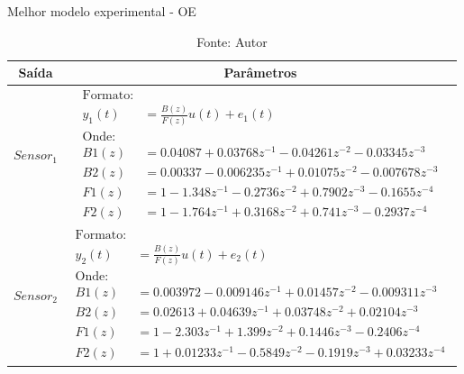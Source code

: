 \begin{table}[h]
	\centering
	\caption{Melhor modelo experimental - OE}
	\label{tab:tclabsp-model-oe}
	\begin{tabular}{c|c} \toprule
		{Saída}			&	{Parâmetros}									\\ \midrule
		$Sensor_1$			&
								$ 
									\begin{aligned}
										\text{Formato:}																	\\
										y_1(t) &= \frac{B(z)}{F(z)}u(t) + e_1(t)										\\
										\text{Onde:}																	\\
										B1(z) &= 0.04087 + 0.03768 z^{-1} - 0.04261 z^{-2} - 0.03345 z^{-3}    			\\
										B2(z) &= 0.00337 - 0.006235 z^{-1} + 0.01075 z^{-2} - 0.007678 z^{-3}  			\\
										F1(z) &= 1 - 1.348 z^{-1} - 0.2736 z^{-2} + 0.7902 z^{-3} - 0.1655 z^{-4}		\\
										F2(z) &= 1 - 1.764 z^{-1} + 0.3168 z^{-2} + 0.741 z^{-3} - 0.2937 z^{-4}   
									\end{aligned}
								$	
							\\ \midrule
		$Sensor_2$			&
								$ 
									\begin{aligned}
										\text{Formato:}																	\\
										y_2(t) &= \frac{B(z)}{F(z)}u(t) + e_2(t)										\\
										\text{Onde:}																	\\
										B1(z) &= 0.003972 - 0.009146 z^{-1} + 0.01457 z^{-2} - 0.009311 z^{-3}    		\\
										B2(z) &= 0.02613 + 0.04639 z^{-1} + 0.03748 z^{-2} + 0.02104 z^{-3}       		\\
										F1(z) &= 1 - 2.303 z^{-1} + 1.399 z^{-2} + 0.1446 z^{-3} - 0.2406 z^{-4}    	\\
										F2(z) &= 1 + 0.01233 z^{-1} - 0.5849 z^{-2} - 0.1919 z^{-3} + 0.03233 z^{-4}  	
									\end{aligned}
								$
							\\ \bottomrule
	\end{tabular}
	\caption*{Fonte: Autor}
\end{table}

